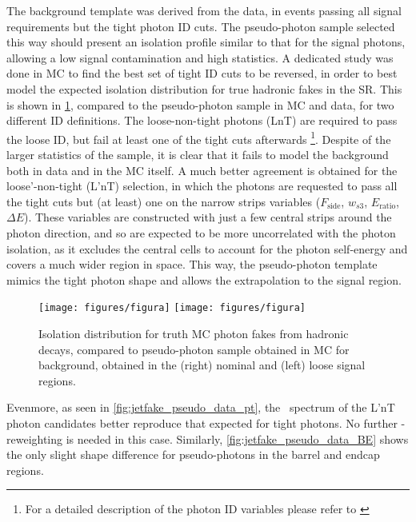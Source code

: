 The background template was derived from the data, in events passing all signal requirements
but the tight photon ID cuts. The pseudo-photon sample selected this way should present an
isolation profile similar to that for the signal photons, allowing a low signal contamination
and high statistics. A dedicated study was done in MC to find the best set of tight ID cuts
to be reversed, in order to best model the expected isolation distribution for true hadronic fakes in the SR.
This is shown in {\fig} \ref{fig:jetfake_mc_data}, compared to the pseudo-photon sample in MC and data,
for two different ID definitions.
The loose-non-tight photons (LnT) are required to pass the loose ID, but fail at least one of
the tight cuts afterwards \footnote{For a detailed description of the photon ID variables
  please refer to \cite{ATLAS-CONF-2012-123}}. Despite of the larger statistics of the sample, it is clear that it
fails to model the background both in data and in the MC itself. A much better agreement is obtained for the loose'-non-tight (L'nT)
selection, in which the photons are requested to pass all the tight cuts but (at least) one on the narrow strips
variables ($F_\text{side}$, $w_{s3}$, $E_\text{ratio}$, $\Delta E$).
These variables are constructed with just a few central strips around the photon direction, and so are expected to be more
uncorrelated with the photon isolation, as it excludes the central cells to account for the photon self-energy
and covers a much wider region in space. This way, the pseudo-photon template mimics the tight photon shape and
allows the extrapolation to the signal region.

\begin{figure}[h]
  \begin{center}
    \texttt{[image: figures/figura]}
    \texttt{[image: figures/figura]}
    \caption{Isolation distribution for truth MC photon fakes from hadronic decays, compared to pseudo-photon
      sample obtained in MC for background, obtained in the (right) nominal and (left) loose signal regions.}
  \label{fig:jetfake_mc_data}
  \end{center}
\end{figure}

Evenmore, as seen in {\fig} \ref{fig:jetfake_pseudo_data_pt}, the \pt\ spectrum of the L'nT photon candidates
better reproduce that expected for tight photons. No further \pt-reweighting is needed in this case.
Similarly, {\fig} \ref{fig:jetfake_pseudo_data_BE} shows the only slight shape difference for pseudo-photons
in the barrel and endcap regions.

